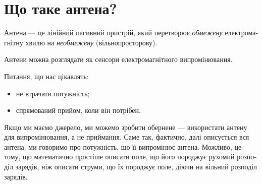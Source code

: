 %
%
%

\renewcommand{\basename}{advancedantennaL1_uk}
\renewcommand{\dirname}{notes/ece1229/}
\newcommand{\keywords}{ECE1229H}


\usepackage{esint}
\usepackage{peeters_layout_exercise}
\usepackage{siunitx}
\usepackage{polyglossia}
\setmainlanguage{ukrainian}

\newcommand{\tiso}[0]{{\textrm{ізо}}}
\newcommand{\tin}[0]{{\textrm{вх}}}
\newcommand{\trad}[0]{{\textrm{вип}}}
\newcommand{\tmax}[0]{{\textrm{max}}}
\newcommand{\tA}[0]{{\textrm{A}}}
\newcommand{\tav}[0]{{\textrm{сер}}}
\newcommand{\tdB}[0]{{\textrm{дБ}}}
\newcommand{\tdBi}[0]{{\textrm{дБі}}}

\newcommand{\timeaverage}[1]{\left[#1\right]}

\beginArtNoToc

\label{chap:advancedantennaL1}

\section{Що таке антена?}
Антена — це лінійний пасивний пристрій, який перетворює \emph{обмежену} електромагнітну хвилю на \emph{необмежену} (вільнопросторову).

Антени можна розглядати як сенсори електромагнітного випромінювання.

Питання, що нас цікавлять:
\begin{itemize}
\item не втрачати потужність;
\item спрямований прийом, коли він потрібен.
\end{itemize}

Якщо ми маємо джерело, ми можемо зробити обернене — використати антену для випромінювання, а не приймання. Саме так, фактично, далі описується вся антена: ми говоримо про потужність, що її випромінює антена. Можливо, це тому, що математично простіше описати поле, що його породжує рухомий розподіл зарядів, ніж описати струми, що їх породжує поле, діючи на вільний розподіл зарядів.

